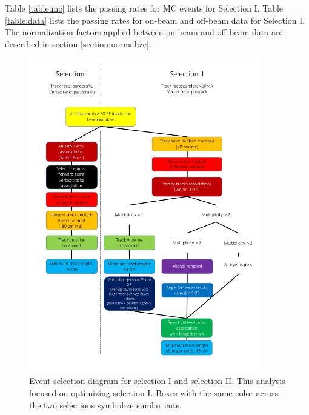 Table \ref{table:mc} lists the passing rates for MC events for Selection I. Table \ref{table:data} lists the passing rates for on-beam and off-beam data for Selection I. The normalization factors applied between on-beam and off-beam data are described in section \ref{section:normalize}.
\begin{figure}[htp!]
\includegraphics[width=0.9\textwidth]{figs/selection.png}
\caption{Event selection diagram for selection I and selection II. This analysis focused on optimizing selection I. Boxes with the same color across the two selections symbolize similar cuts.}
\label{fig:selection}
\end{figure}

